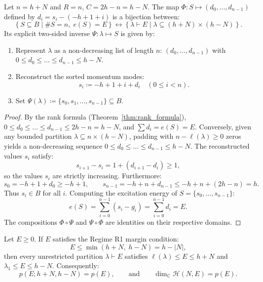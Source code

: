 \begin{theorem}
\label{thm:app_rectangle_bijection}
Let $n = h + N$ and $R = n$, $C = 2h - n = h - N$.
The map $\Phi: S \mapsto (d_0, \dots, d_{n-1})$ defined by $d_i = s_i - (-h + 1 + i)$ is a bijection between:
\begin{equation}
\left\{ S \subseteq B \mid \#S = n,\; e(S) = E \right\} \longleftrightarrow \left\{ \lambda \vdash E \mid \lambda \subseteq (h+N) \times (h-N) \right\}.
\end{equation}
Its explicit two-sided inverse $\Psi: \lambda \mapsto S$ is given by:
\begin{enumerate}
    \item Represent $\lambda$ as a non-decreasing list of length $n$: $(d_0, \dots, d_{n-1})$ with $0 \le d_0 \le \dots \le d_{n-1} \le h - N$.
    \item Reconstruct the sorted momentum modes:
    \begin{equation}
    s_i \coloneqq -h + 1 + i + d_i \quad (0 \le i < n).
    \end{equation}
    \item Set $\Psi(\lambda) \coloneqq \{s_0, s_1, \dots, s_{n-1}\} \subseteq B$.
\end{enumerate}
\end{theorem}

\begin{proof}
By the rank formula (Theorem~\ref{thm:rank_formula}), $0 \le d_0 \le \dots \le d_{n-1} \le 2h - n = h - N$, and $\sum d_i = e(S) = E$.
Conversely, given any bounded partition $\lambda \subseteq n \times (h-N)$, padding with $n - \ell(\lambda) \ge 0$ zeros yields a non-decreasing sequence $0 \le d_0 \le \dots \le d_{n-1} \le h - N$.
The reconstructed values $s_i$ satisfy:
\[
s_{i+1} - s_i = 1 + (d_{i+1} - d_i) \ge 1,
\]
so the values $s_i$ are strictly increasing.
Furthermore:
\[
s_0 = -h + 1 + d_0 \ge -h + 1, \qquad s_{n-1} = -h + n + d_{n-1} \le -h + n + (2h - n) = h.
\]
Thus $s_i \in B$ for all $i$.
Computing the excitation energy of $S = \{s_0, \dots, s_{n-1}\}$:
\[
e(S) = \sum_{i=0}^{n-1} (s_i - g_i) = \sum_{i=0}^{n-1} d_i = E.
\]
The compositions $\Phi \circ \Psi$ and $\Psi \circ \Phi$ are identities on their respective domains.
\end{proof}

\begin{theorem}
\label{thm:app_r1_condition}
Let $E \ge 0$. If $E$ satisfies the Regime R1 margin condition:
\begin{equation}
E \le \min(h + N, \; h - N) = h - |N|,
\end{equation}
then every unrestricted partition $\lambda \vdash E$ satisfies $\ell(\lambda) \le E \le h+N$ and $\lambda_1 \le E \le h-N$.
Consequently:
\begin{equation}
p(E; h+N, h-N) = p(E), \qquad \text{and} \qquad \dim_{\mathbb{C}} \mathcal{H}(N, E) = p(E).
\end{equation}
\end{theorem}


